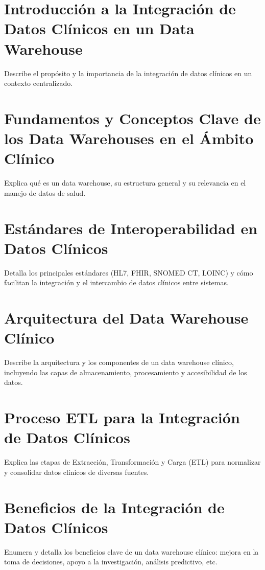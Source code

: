 \documentclass[12pt, a4paper, twoside]{article}
\begin{document}
	
	
	
	\clearpage
	\setcounter{page}{1}
	
	
	
	\tableofcontents
	\newpage
	
	\section{Introducción a la Integración de Datos Clínicos en un Data Warehouse}
	Describe el propósito y la importancia de la integración de datos clínicos en un contexto centralizado.
	
	\section{Fundamentos y Conceptos Clave de los Data Warehouses en el Ámbito Clínico}
	Explica qué es un data warehouse, su estructura general y su relevancia en el manejo de datos de salud.
	
	\section{Estándares de Interoperabilidad en Datos Clínicos}
	Detalla los principales estándares (HL7, FHIR, SNOMED CT, LOINC) y cómo facilitan la integración y el intercambio de datos clínicos entre sistemas.
	
	\section{Arquitectura del Data Warehouse Clínico}
	Describe la arquitectura y los componentes de un data warehouse clínico, incluyendo las capas de almacenamiento, procesamiento y accesibilidad de los datos.
	
	\section{Proceso ETL para la Integración de Datos Clínicos}
	Explica las etapas de Extracción, Transformación y Carga (ETL) para normalizar y consolidar datos clínicos de diversas fuentes.
	
	\section{Beneficios de la Integración de Datos Clínicos}
	Enumera y detalla los beneficios clave de un data warehouse clínico: mejora en la toma de decisiones, apoyo a la investigación, análisis predictivo, etc.
	
\end{document}
